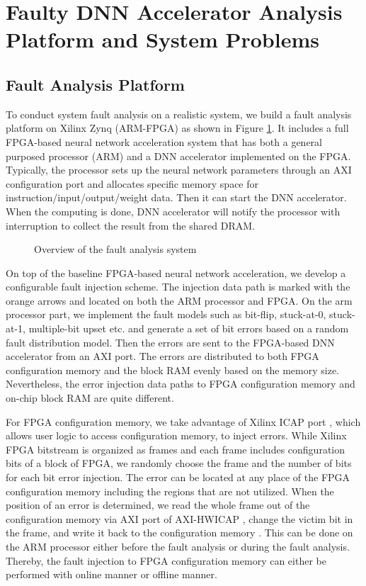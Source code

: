 \section{Faulty DNN Accelerator Analysis Platform and System Problems}
\label{sec:fault-analysis}
\subsection{Fault Analysis Platform}
To conduct system fault analysis on a realistic system, we build a fault 
analysis platform on Xilinx Zynq (ARM-FPGA) as shown in 
Figure \ref{fig:fault-analysis-overview}. It includes a full FPGA-based 
neural network acceleration system that has both a general purposed 
processor (ARM) and a DNN accelerator implemented on the FPGA. 
Typically, the processor sets up the neural network parameters through 
an AXI configuration port and allocates specific memory 
space for instruction/input/output/weight data. Then it can 
start the DNN accelerator. When the computing is done, DNN accelerator 
will notify the processor with interruption to collect the result from the 
shared DRAM. 

\begin{figure}
    \caption{Overview of the fault analysis system}
\vspace{-0.5em}
\label{fig:fault-analysis-overview}
\end{figure}

On top of the baseline FPGA-based neural network acceleration, 
we develop a configurable fault injection scheme. The injection data path 
is marked with the orange arrows and located on both the ARM processor and 
FPGA. On the arm processor part, we implement the fault models such as bit-flip, 
stuck-at-0, stuck-at-1, multiple-bit upset etc. and generate a set of bit errors 
based on a random fault distribution model. Then the errors are sent to 
the FPGA-based DNN accelerator from an AXI port. The errors are distributed to 
both FPGA configuration memory and the block RAM evenly based on the memory size.
Nevertheless, the error injection data paths to FPGA configuration memory 
and on-chip block RAM are quite different.

For FPGA configuration memory, we take advantage of Xilinx ICAP 
port \cite{UG953}, which allows user logic to access configuration 
memory, to inject errors. While Xilinx FPGA bitstream is organized 
as frames and each frame includes configuration bits of a block of 
FPGA, we randomly choose the frame and the number of bits for each 
bit error injection. The error can be located at any place of the 
FPGA configuration memory including the regions that are not utilized.
When the position of an error is determined, we read the whole frame 
out of the configuration memory via AXI port of AXI-HWICAP \cite{PG134}, 
change the victim bit in the frame, and write it back to the configuration 
memory \cite{UG470}. This can be done on the ARM processor either before the fault 
analysis or during the fault analysis. Thereby, the fault injection 
to FPGA configuration memory can either be performed with online 
manner or offline manner.

